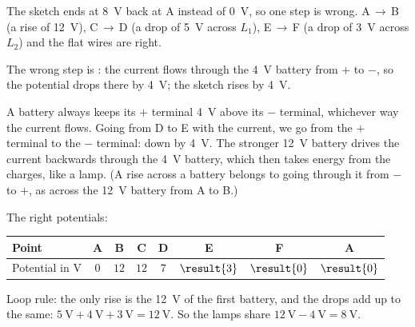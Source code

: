 \begin{abcliste}
\abc The sketch ends at \SI{8}{\V} back at A instead of \SI{0}{\V}, so one step is wrong. A\,$\to$\,B (a rise of \SI{12}{\V}), C\,$\to$\,D (a drop of \SI{5}{\V} across $L_1$), E\,$\to$\,F (a drop of \SI{3}{\V} across $L_2$) and the flat wires are right.

The wrong step is : the current flows through the \SI{4}{\V} battery from $+$ to $-$, so the potential drops there by \SI{4}{\V}; the sketch rises by \SI{4}{\V}.

\abc A battery always keeps its $+$ terminal \SI{4}{\V} above its $-$ terminal, whichever way the current flows. Going from D to E with the current, we go from the $+$ terminal to the $-$ terminal: down by \SI{4}{\V}. The stronger \SI{12}{\V} battery drives the current backwards through the \SI{4}{\V} battery, which then takes energy from the charges, like a lamp. (A rise across a battery belongs to going through it from $-$ to $+$, as across the \SI{12}{\V} battery from A to B.)

\abc The right potentials:
\begin{center}
\begin{tabular}{l|ccccccc}
 Point & A & B & C & D & E & F & A \\ \hline
 Potential in \si{\V} & $0$ & $12$ & $12$ & $7$ & $\result{3}$ & $\result{0}$ & $\result{0}$ \\
\end{tabular}

\medskip
{}
\end{center}
Loop rule: the only rise is the \SI{12}{\V} of the first battery, and the drops add up to the same: $\SI{5}{\V} + \SI{4}{\V} + \SI{3}{\V} = \SI{12}{\V}$. So the lamps share $\SI{12}{\V} - \SI{4}{\V} = \SI{8}{\V}$.
\end{abcliste}
